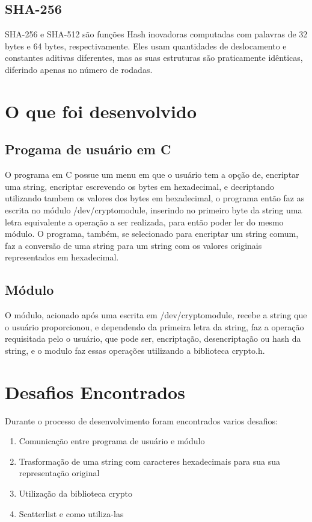 \subsection{SHA-256}

SHA-256 e SHA-512 são funções Hash inovadoras computadas com palavras de 32 bytes e 64 bytes, respectivamente. Eles usam quantidades de deslocamento e constantes aditivas diferentes, mas as suas estruturas são praticamente idênticas, diferindo apenas no número de rodadas.


\section{O que foi desenvolvido}

\subsection{Progama de usuário em C}

O programa em C possue um menu em que o usuário tem a opção de, encriptar uma string, encriptar escrevendo os bytes em hexadecimal, e decriptando utilizando tambem os valores dos bytes em hexadecimal, o programa então faz as escrita no módulo /dev/cryptomodule, inserindo no primeiro byte da string uma letra equivalente a operação a ser realizada, para então poder ler do mesmo módulo. O programa, também, se selecionado para encriptar um string comum, faz a conversão de uma string para um string com os valores originais representados em hexadecimal.

\subsection{Módulo}

O módulo, acionado após uma escrita em /dev/cryptomodule, recebe a string que o usuário proporcionou, e dependendo da primeira letra da string, faz a operação requisitada pelo o usuário, que pode ser, encriptação, desencriptação ou hash da string, e o modulo faz essas operações utilizando a biblioteca crypto.h.


\section{Desafios Encontrados}

Durante o processo de desenvolvimento foram encontrados varios desafios:

\begin{enumerate}
\item Comunicação entre programa de usuário e módulo
\item Trasformação de uma string com caracteres hexadecimais para sua sua representação original
\item Utilização da biblioteca crypto
\item Scatterlist e como utiliza-las
\end{enumerate}

